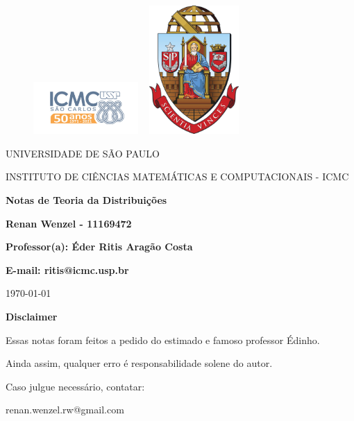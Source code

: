 \documentclass[12pt]{article}
\theoremstyle{definition} %
\begin{document}
\begin{figure}[ht]
	\includegraphics[width=4cm]{../icmc.png}
	\hspace{7cm}
	\includegraphics[height=4.9cm,width=4cm]{../brasao_usp_cor.jpg}
	\endminipage
\end{figure}

\begin{center}
	\vspace{1cm}
	\LARGE
	UNIVERSIDADE DE SÃO PAULO

	\vspace{1.3cm}
	\LARGE
	INSTITUTO DE CIÊNCIAS MATEMÁTICAS E COMPUTACIONAIS - ICMC

	\vspace{1.7cm}
	\Large
	\textbf{Notas de Teoria da Distribuições}

	\vspace{1.3cm}
	\large
	\textbf{Renan Wenzel - 11169472}

	\vspace{1.3cm}
	\large
	\textbf{Professor(a): Éder Ritis Aragão Costa}

	\textbf{E-mail: ritis@icmc.usp.br}

	\vspace{1.3cm}
	\today
\end{center}

\newpage
\textbf{{\Huge Disclaimer}}

{\huge Essas notas foram feitos a pedido do estimado e famoso professor Édinho.

	Ainda assim, qualquer erro é responsabilidade solene do autor.

	Caso julgue necessário, contatar:

	renan.wenzel.rw@gmail.com}
\tableofcontents

\newpage
\end{document}
